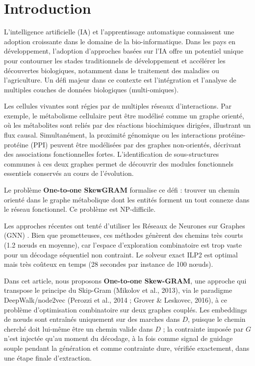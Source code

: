 \documentclass{llncs}
\begin{document}
\section{Introduction}

L'intelligence artificielle (IA) et l'apprentissage automatique connaissent une adoption croissante dans le domaine de la bio-informatique. Dans les pays en développement, l'adoption d'approches basées sur l'IA offre un potentiel unique pour contourner les stades traditionnels de développement et accélérer les découvertes biologiques, notamment dans le traitement des maladies ou l'agriculture. Un défi majeur dans ce contexte est l'intégration et l'analyse de multiples couches de données biologiques (multi-omiques).

Les cellules vivantes sont régies par de multiples réseaux d'interactions. Par exemple, le métabolisme cellulaire peut être modélisé comme un graphe orienté, où les métabolites sont reliés par des réactions biochimiques dirigées, illustrant un flux causal. Simultanément, la proximité génomique ou les interactions protéine-protéine (PPI) peuvent être modélisées par des graphes non-orientés, décrivant des associations fonctionnelles fortes. L'identification de sous-structures communes à ces deux graphes permet de découvrir des modules fonctionnels essentiels conservés au cours de l'évolution.

Le problème \textbf{One-to-one SkewGRAM} formalise ce défi : trouver un chemin orienté dans le graphe métabolique dont les entités forment un tout connexe dans le réseau fonctionnel. Ce problème est NP-difficile.

Les approches récentes ont tenté d'utiliser les Réseaux de Neurones sur Graphes (GNN) \cite{sidi}. Bien que prometteuses, ces méthodes génèrent des chemins très courts (1.2 nœuds en moyenne), car l'espace d'exploration combinatoire est trop vaste pour un décodage séquentiel non contraint. Le solveur exact ILP2 \cite{sidi} est optimal mais très coûteux en temps (28 secondes par instance de 100 nœuds).

Dans cet article, nous proposons \textbf{One-to-one Skew-GRAM}, une approche qui transpose le principe du Skip-Gram (Mikolov et al., 2013), via le paradigme DeepWalk/node2vec (Perozzi et al., 2014 ; Grover \& Leskovec, 2016), à ce problème d'optimisation combinatoire sur deux graphes couplés. Les embeddings de nœuds sont entraînés uniquement sur des marches dans $D$, puisque le chemin cherché doit lui-même être un chemin valide dans $D$ ; la contrainte imposée par $G$ n'est injectée qu'au moment du décodage, à la fois comme signal de guidage souple pendant la génération et comme contrainte dure, vérifiée exactement, dans une étape finale d'extraction.
\end{document}
